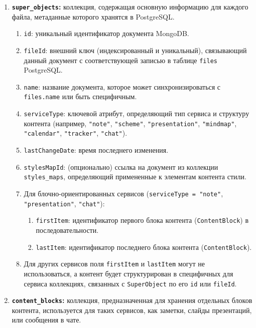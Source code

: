 \begin{enumerate}
    \item \textbf{\texttt{super\_objects}:} коллекция, содержащая основную информацию для каждого файла, метаданные которого хранятся в PostgreSQL.
    \begin{enumerate}
        \item \texttt{id}: уникальный идентификатор документа MongoDB.
        \item \texttt{fileId}: внешний ключ (индексированный и уникальный), связывающий данный документ с соответствующей записью в таблице \texttt{files} PostgreSQL.
        \item \texttt{name}: название документа, которое может синхронизироваться с \texttt{files.name} или быть специфичным.
        \item \texttt{serviceType}: ключевой атрибут, определяющий тип сервиса и структуру контента (например, \texttt{"note"}, \texttt{"scheme"}, \texttt{"presentation"}, \texttt{"mindmap"}, \texttt{"calendar"}, \texttt{"tracker"}, \texttt{"chat"}).
        \item \texttt{lastChangeDate}: время последнего изменения.
        \item \texttt{stylesMapId}: (опционально) ссылка на документ из коллекции \texttt{styles\_maps}, определяющий примененные к элементам контента стили.
        \item Для блочно-ориентированных сервисов (\texttt{serviceType = "note"}, \texttt{"presentation"}, \texttt{"chat"}):
        \begin{enumerate}
            \item \texttt{firstItem}: идентификатор первого блока контента (\texttt{ContentBlock}) в последовательности.
            \item \texttt{lastItem}: идентификатор последнего блока контента (\texttt{ContentBlock}).
        \end{enumerate}
        \item Для других сервисов поля \texttt{firstItem} и \texttt{lastItem} могут не использоваться, а контент будет структурирован в специфичных для сервиса коллекциях, связанных с \texttt{SuperObject} по его \texttt{id} или \texttt{fileId}.
    \end{enumerate}
    \item \textbf{\texttt{content\_blocks}:} коллекция, предназначенная для хранения отдельных блоков контента, используется для таких сервисов, как заметки, слайды презентаций, или сообщения в чате.
    \begin{enumerate}

\end{enumerate}
\end{enumerate}
